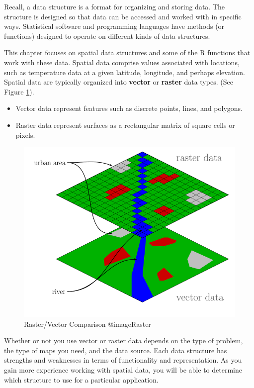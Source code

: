 \documentclass[]{krantz}
\providecommand{\tightlist}{%
  \setlength{\itemsep}{0pt}\setlength{\parskip}{0pt}}
\begin{document}
Recall, a data structure is a format for organizing and storing data. The structure is designed so that data can be accessed and worked with in specific ways. Statistical software and programming languages have methods (or functions) designed to operate on different kinds of data structures.

This chapter focuses on spatial data structures and some of the R functions that work with these data. Spatial data comprise values associated with locations, such as temperature data at a given latitude, longitude, and perhaps elevation. Spatial data are typically organized into \textbf{vector} or \textbf{raster} data types. (See Figure \ref{fig:raster}).

\begin{itemize}
\tightlist
\item
  Vector data represent features such as discrete points, lines, and polygons.
\item
  Raster data represent surfaces as a rectangular matrix of square cells or pixels.
\end{itemize}

\begin{figure}

{\centering \includegraphics[width=1\linewidth]{08-spatialData/08-images/rasterVector} 

}

\caption{Raster/Vector Comparison @imageRaster}\label{fig:raster}
\end{figure}

Whether or not you use vector or raster data depends on the type of problem, the type of maps you need, and the data source. Each data structure has strengths and weaknesses in terms of functionality and representation. As you gain more experience working with spatial data, you will be able to determine which structure to use for a particular application.
\end{document}
